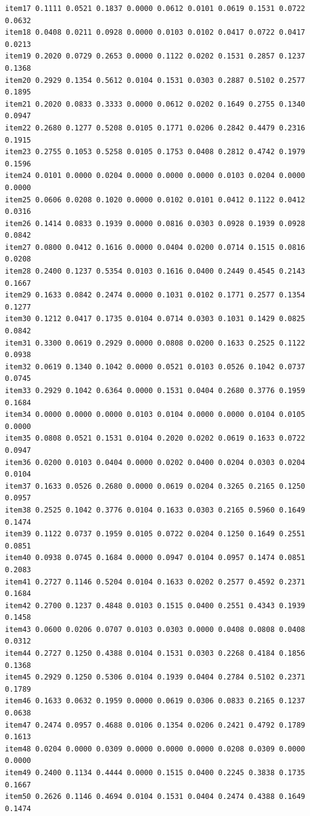 \documentclass[
  a4paper,
]{ltjsbook}
\begin{document}
\begin{verbatim}
item17 0.1111 0.0521 0.1837 0.0000 0.0612 0.0101 0.0619 0.1531 0.0722 0.0632
item18 0.0408 0.0211 0.0928 0.0000 0.0103 0.0102 0.0417 0.0722 0.0417 0.0213
item19 0.2020 0.0729 0.2653 0.0000 0.1122 0.0202 0.1531 0.2857 0.1237 0.1368
item20 0.2929 0.1354 0.5612 0.0104 0.1531 0.0303 0.2887 0.5102 0.2577 0.1895
item21 0.2020 0.0833 0.3333 0.0000 0.0612 0.0202 0.1649 0.2755 0.1340 0.0947
item22 0.2680 0.1277 0.5208 0.0105 0.1771 0.0206 0.2842 0.4479 0.2316 0.1915
item23 0.2755 0.1053 0.5258 0.0105 0.1753 0.0408 0.2812 0.4742 0.1979 0.1596
item24 0.0101 0.0000 0.0204 0.0000 0.0000 0.0000 0.0103 0.0204 0.0000 0.0000
item25 0.0606 0.0208 0.1020 0.0000 0.0102 0.0101 0.0412 0.1122 0.0412 0.0316
item26 0.1414 0.0833 0.1939 0.0000 0.0816 0.0303 0.0928 0.1939 0.0928 0.0842
item27 0.0800 0.0412 0.1616 0.0000 0.0404 0.0200 0.0714 0.1515 0.0816 0.0208
item28 0.2400 0.1237 0.5354 0.0103 0.1616 0.0400 0.2449 0.4545 0.2143 0.1667
item29 0.1633 0.0842 0.2474 0.0000 0.1031 0.0102 0.1771 0.2577 0.1354 0.1277
item30 0.1212 0.0417 0.1735 0.0104 0.0714 0.0303 0.1031 0.1429 0.0825 0.0842
item31 0.3300 0.0619 0.2929 0.0000 0.0808 0.0200 0.1633 0.2525 0.1122 0.0938
item32 0.0619 0.1340 0.1042 0.0000 0.0521 0.0103 0.0526 0.1042 0.0737 0.0745
item33 0.2929 0.1042 0.6364 0.0000 0.1531 0.0404 0.2680 0.3776 0.1959 0.1684
item34 0.0000 0.0000 0.0000 0.0103 0.0104 0.0000 0.0000 0.0104 0.0105 0.0000
item35 0.0808 0.0521 0.1531 0.0104 0.2020 0.0202 0.0619 0.1633 0.0722 0.0947
item36 0.0200 0.0103 0.0404 0.0000 0.0202 0.0400 0.0204 0.0303 0.0204 0.0104
item37 0.1633 0.0526 0.2680 0.0000 0.0619 0.0204 0.3265 0.2165 0.1250 0.0957
item38 0.2525 0.1042 0.3776 0.0104 0.1633 0.0303 0.2165 0.5960 0.1649 0.1474
item39 0.1122 0.0737 0.1959 0.0105 0.0722 0.0204 0.1250 0.1649 0.2551 0.0851
item40 0.0938 0.0745 0.1684 0.0000 0.0947 0.0104 0.0957 0.1474 0.0851 0.2083
item41 0.2727 0.1146 0.5204 0.0104 0.1633 0.0202 0.2577 0.4592 0.2371 0.1684
item42 0.2700 0.1237 0.4848 0.0103 0.1515 0.0400 0.2551 0.4343 0.1939 0.1458
item43 0.0600 0.0206 0.0707 0.0103 0.0303 0.0000 0.0408 0.0808 0.0408 0.0312
item44 0.2727 0.1250 0.4388 0.0104 0.1531 0.0303 0.2268 0.4184 0.1856 0.1368
item45 0.2929 0.1250 0.5306 0.0104 0.1939 0.0404 0.2784 0.5102 0.2371 0.1789
item46 0.1633 0.0632 0.1959 0.0000 0.0619 0.0306 0.0833 0.2165 0.1237 0.0638
item47 0.2474 0.0957 0.4688 0.0106 0.1354 0.0206 0.2421 0.4792 0.1789 0.1613
item48 0.0204 0.0000 0.0309 0.0000 0.0000 0.0000 0.0208 0.0309 0.0000 0.0000
item49 0.2400 0.1134 0.4444 0.0000 0.1515 0.0400 0.2245 0.3838 0.1735 0.1667
item50 0.2626 0.1146 0.4694 0.0104 0.1531 0.0404 0.2474 0.4388 0.1649 0.1474

\end{verbatim}
\end{document}
